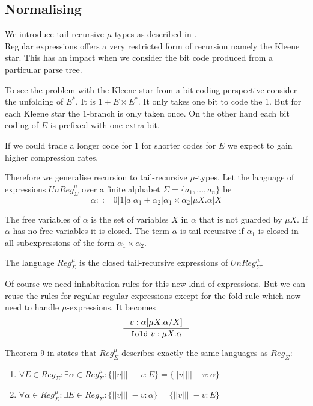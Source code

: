 \documentclass[a4paper, oneside]{memoir}
\theoremstyle{definition}
\begin{document}
\subsection{Normalising}

We introduce tail-recursive $\mu$-types as described in \cite{heni10}.\\[1em]

Regular expressions offers a very restricted form of recursion namely the Kleene
star. This has an impact when we consider the bit code produced from a
particular parse tree.

To see the problem with the Kleene star from a bit coding perspective consider
the unfolding of $E^{\ast}$. It is $1 + E \times E^{\ast}$. It only takes one
bit to code the $1$. But for each Kleene star the $1$-branch is only taken
once. On the other hand each bit coding of $E$ is prefixed with one extra
bit.

If we could trade a longer code for $1$ for shorter codes for $E$ we expect to
gain higher compression rates.

Therefore we generalise recursion to tail-recursive $\mu$-types. Let the
language of expressions $UnReg_{\Sigma}^{\mu}$ over a finite alphabet $\Sigma =
\{a_1, \ldots, a_n\}$ be
\[
\alpha ::= 0 | 1 | a | \alpha_1 + \alpha_2 | \alpha_1 \times \alpha_2 | \mu
X. \alpha | X
\]

The free variables of $\alpha$ is the set of variables $X$ in $\alpha$ that is
not guarded by $\mu X$. If $\alpha$ has no free variables it is closed. The term
$\alpha$ is tail-recursive if $\alpha_1$ is closed in all subexpressions of the
form $\alpha_1 \times \alpha_2$.

The language $Reg_{\Sigma}^{\mu}$ is the closed tail-recursive expressions of
$UnReg_{\Sigma}^{\mu}$.

Of course we need inhabitation rules for this new kind of expressions. But we
can reuse the rules for regular regular expressions except for the fold-rule
which now need to handle $\mu$-expressions. It becomes
\[
\inference{v : \alpha \lbrack \mu X. \alpha / X \rbrack}{\mathtt{fold}\ v : \mu X. \alpha}
\]

Theorem 9 in \cite{heli10} states that $Reg_{\Sigma}^{\mu}$ describes exactly
the same languages as $Reg_{\Sigma}$:
\begin{enumerate}
\item $\forall E \in Reg_{\Sigma} : \exists \alpha \in Reg_{\Sigma}^{\mu} :
  \{||v|| | |- v : E\} = \{||v|| | |- v : \alpha \}$
\item $\forall \alpha \in Reg_{\Sigma}^{\mu} : \exists E \in Reg_{\Sigma} :
  \{||v|| | |- v : \alpha\} = \{||v|| | |- v : E \}$
\end{enumerate}
\end{document}
